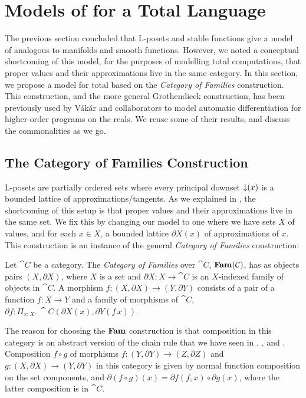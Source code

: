 \section{Models of \GPS for a Total Language}
\label{sec:models-of-total-gps}

The previous section concluded that L-posets and stable functions give
a model of \GPS analogous to manifolds and smooth functions. However,
we noted a conceptual shortcoming of this model, for the purposes of
modelling total computations, that proper values and their
approximations live in the same category. In this section, we propose
a model for total \GPS based on the \emph{Category of Families}
construction. This construction, and the more general Grothendieck
construction, has been previously used by V{\'a}k{\'a}r and
collaborators  to model automatic differentiation for
higher-order programs on the reals. We reuse some of their results,
and discuss the commonalities as we go.

\subsection{The Category of Families Construction}
\label{sec:models-of-total-gps:fam}

L-posets are partially ordered sets where every principal downset
$\mathop{\downarrow}(x)$ is a bounded lattice of approximations/tangents. As we
explained in , the shortcoming of this setup is that
proper values and their approximations live in the same set. We fix
this by changing our model to one where we have sets $X$ of values,
and for each $x \in X$, a bounded lattice $\partial X(x)$ of
approximations of $x$. This construction is an instance of the general
\emph{Category of Families} construction:

\begin{definition}
  Let $\cat{C}$ be a category. The \emph{Category of Families} over
  $\cat{C}$, $\mathbf{Fam}(\mathcal{C})$, has as objects pairs $(X, \partial X)$,
  where $X$ is a set and $\partial X : X \to \cat{C}$ is an
  $X$-indexed family of objects in $\cat{C}$. A morphism
  $f : (X, \partial X) \to (Y, \partial Y)$ consists of a pair of a
  function $f : X \to Y$ and a family of morphisms of $\cat{C}$,
  $\partial f : \Pi_{x : X}.\,\cat{C}(\partial X(x), \partial Y(f\,x))$.
\end{definition}

The reason for choosing the $\mathbf{Fam}$ construction is that composition in
this category is an abstract version of the chain rule that we have
seen in , , and
. Composition $f \circ g $ of morphisms
$f : (Y, \partial Y) \to (Z, \partial Z)$ and
$g : (X, \partial X) \to (Y, \partial Y)$ in this category is given by
normal function composition on the set components, and
$\partial (f \circ g)(x) = \partial f(f, x) \circ \partial g(x)$,
where the latter composition is in $\cat{C}$.

